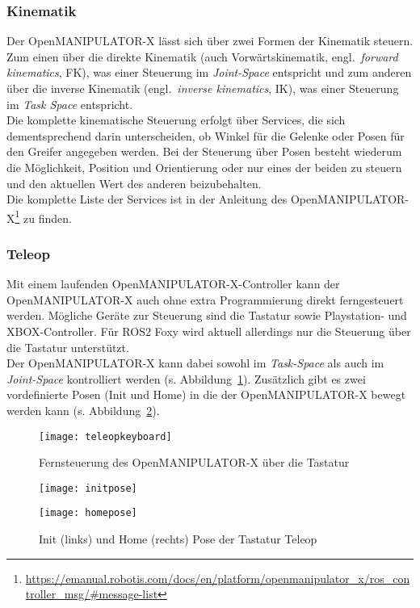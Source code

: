\subsubsection{Kinematik}
Der OpenMANIPULATOR-X lässt sich über zwei Formen der Kinematik steuern.
Zum einen über die direkte Kinematik (auch Vorwärtskinematik, engl.\ \emph{forward kinematics}, FK), was einer Steuerung im \emph{Joint-Space} entspricht und zum anderen über die inverse Kinematik (engl.\ \emph{inverse kinematics}, IK), was einer Steuerung im \emph{Task Space} entspricht.\\
Die komplette kinematische Steuerung erfolgt über Services, die sich dementsprechend darin unterscheiden, ob Winkel für die Gelenke oder Posen für den Greifer angegeben werden.
Bei der Steuerung über Posen besteht wiederum die Möglichkeit, Position und Orientierung oder nur eines der beiden zu steuern und den aktuellen Wert des anderen beizubehalten.\\
Die komplette Liste der Services ist in der Anleitung des OpenMANIPULATOR-X\footnote{\url{https://emanual.robotis.com/docs/en/platform/openmanipulator_x/ros_controller_msg/#message-list}} zu finden.


\subsubsection{Teleop} \label{teleop}
Mit einem laufenden OpenMANIPULATOR-X-Controller kann der OpenMANIPULATOR-X auch ohne extra Programmierung direkt ferngesteuert werden.
Mögliche Geräte zur Steuerung sind die Tastatur sowie Playstation- und XBOX-Controller.
Für \ac{ROS2} Foxy wird aktuell allerdings nur die Steuerung über die Tastatur unterstützt.\\
Der OpenMANIPULATOR-X kann dabei sowohl im \emph{Task-Space} als auch im \emph{Joint-Space} kontrolliert werden (s. Abbildung~\ref{fig:teleopkeyboard}).
Zusätzlich gibt es zwei vordefinierte Posen (Init und Home) in die der OpenMANIPULATOR-X bewegt werden kann (s. Abbildung~\ref{fig:teleopposes}).
\begin{figure}[ht!]
\centering
\texttt{[image: teleopkeyboard]}
\caption{Fernsteuerung des OpenMANIPULATOR-X über die Tastatur}
\label{fig:teleopkeyboard}
\end{figure}
\begin{figure}[htb]
    \centering
    \begin{minipage}[t]{0.45\linewidth}
        \centering
        \texttt{[image: initpose]}
    \end{minipage}%
    \hfill
    \begin{minipage}[t]{0.45\linewidth}
        \centering
        \texttt{[image: homepose]}
    \end{minipage}
    \caption{Init (links) und Home (rechts) Pose der Tastatur Teleop}
    \label{fig:teleopposes}
\end{figure}



